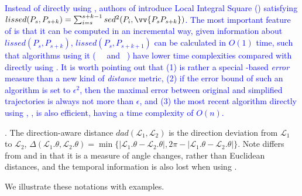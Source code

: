 \textcolor{blue}{Instead of directly using \sed, authors of \cite{Chen:Fast} introduce Local Integral Square \sed (\lissed) satisfying $lissed(P_s,P_{s+k}) = \sum_{i=s}^{s+k-1} sed^2(P_i, \vv{P_sP_{s+k}})$. The most important feature of \lissed is that it can be computed in an incremental way, \ie given information about $lissed(P_s,P_{s+k})$, $lissed(P_s,P_{s+k+1})$ can be calculated in $O(1)$ time, such that algorithms using it (\eg~\bumr~\cite{Chen:Fast} and \dagots~\cite{Cao:Dots}) have lower time complexities compared with directly using \sed. 
It is worth pointing out that (1) \lissed is rather a special \sed-based \emph{error} measure than a new kind of \emph{distance} metric, (2) if the \lissed error bound of such an algorithm is set to $\epsilon^2$, then the maximal \sed error between original and simplified trajectories is always not more than $\epsilon$, and (3) the most recent algorithm directly using \sed, \cised, is also efficient, having a time complexity of $O(n)$.}


. The direction-aware distance $dad\left(\mathcal{L}_1, \mathcal{L}_2\right)$ is the direction deviation from $\mathcal{L}_1$ to $\mathcal{L}_2$, \ie $\Delta\left(\mathcal{L}_1.\theta, \mathcal{L}_2.\theta\right) = \min\{|\mathcal{L}_1.\theta - \mathcal{L}_2.\theta|, 2\pi - |\mathcal{L}_1.\theta - \mathcal{L}_2.\theta|\}$.
{Note \dad differs from \ped and \sed in that it is a measure of angle changes, rather than Euclidean distances, and the temporal information is also lost when using \dad.}





We illustrate these notations with examples.

